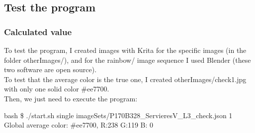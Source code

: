 \subsection{Test the program}
\subsubsection{Calculated value}
To test the program, I created images with Krita for the specific images (in the folder otherImages/), and for the rainbow/ image sequence I used Blender (these two software are open source).\\
To test that the average color is the true one, I created otherImages/check1.jpg with only one solid color \#ee7700.\\
Then, we just need to execute the program:
\begin{resultbox}
bash \$ ./start.sh single imageSets/P170B328\_ServieresV\_L3\_check.json 1\\
Global average color: \#ee7700, R:238 G:119 B:  0
\end{resultbox}